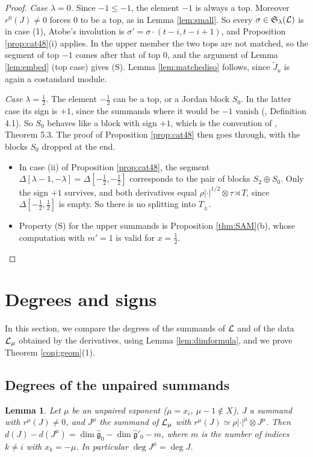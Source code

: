 \documentclass[a4paper,12pt,leqno]{amsart}
\theoremstyle{plain}
\newtheorem{lemma}[thm]{Lemma}
\theoremstyle{definition}
\providecommand{\frS}{\mathfrak{S}}\providecommand{\frs}{\mathfrak{s}}
\begin{document}
\begin{proof}
\emph{Case $\lambda=0$.} Since $-1\leq-1$, the element $-1$ is always a top. Moreover $r^0(J)\neq0$ forces
$0$ to be a top, as in Lemma \ref{lem:small}. So every $\sigma\in\frS_\lambda(\caL)$ is in case (1), Atobe's involution
is $\sigma'=\sigma\cdot(t-i,t-i+1)$, and Proposition \ref{prop:cat48}(i) applies. In the upper member
the two tops are not matched, so the segment of top $-1$ comes after that of top $0$, and the
argument of Lemma \ref{lem:embed} (top case) gives (S). Lemma \ref{lem:matchediso} follows, since $\widetilde J_u$
is again a costandard module.

\emph{Case $\lambda=\tfrac12$.} The element $-\tfrac12$ can be a top, or a Jordan block $S_0$. In the
latter case its sign is $+1$, since the summands where it would be $-1$ vanish (\cite{Ato24},
Definition 4.1). So $S_0$ behaves like a block with sign $+1$, which is the convention of
\cite{AM23}, Theorem 5.3. The proof of Proposition \ref{prop:cat48} then goes
through, with the blocks $S_0$ dropped at the end.
\begin{itemize}
\item In case (ii) of Proposition \ref{prop:cat48}, the segment $\Delta[\lambda-1,-\lambda]=\Delta[-\tfrac12,-\tfrac12]$
corresponds to the pair of blocks $S_2\oplus S_0$. Only the sign $+1$ survives, and both
derivatives equal $\rho|\cdot|^{1/2}\otimes\tau\rtimes T$, since $\Delta[-\tfrac12,\tfrac12]$ is
empty. So there is no splitting into $T_\pm$.
\item Property (S) for the upper summands is Proposition \ref{thm:SAM}(b), whose computation with
$m'=1$ is valid for $x=\tfrac12$.
\end{itemize}
\end{proof}

\section{Degrees and signs}\label{sec:degsigns}
In this section, we compare the degrees of the summands of $\mathcal{L}$ and of the data $\mathcal{L}_\mu$ obtained by
the derivatives, using Lemma \ref{lem:dimformula}, and we prove Theorem \ref{conj:geom}(1).

\subsection{Degrees of the unpaired summands}
\begin{lemma}\label{lem:degunpaired} Let $\mu$ be an unpaired exponent ($\mu=x_i$, $\mu-1\notin X$),
$J$ a summand with $r^\mu(J)\neq0$, and $J^\mu$ the summand of $\mathcal{L}_\mu$ with
$r^\mu(J)\simeq\rho|\cdot|^\mu\otimes J^\mu$. Then $d(J)-d(J^\mu)=\dim\widehat{\mathfrak g}_0-
\dim\widehat{\mathfrak g}'_0-m$, where $m$ is the number of indices $k\neq i$ with $x_k=-\mu$. In
particular $\deg J^\mu=\deg J$.
\end{lemma}
\end{document}
